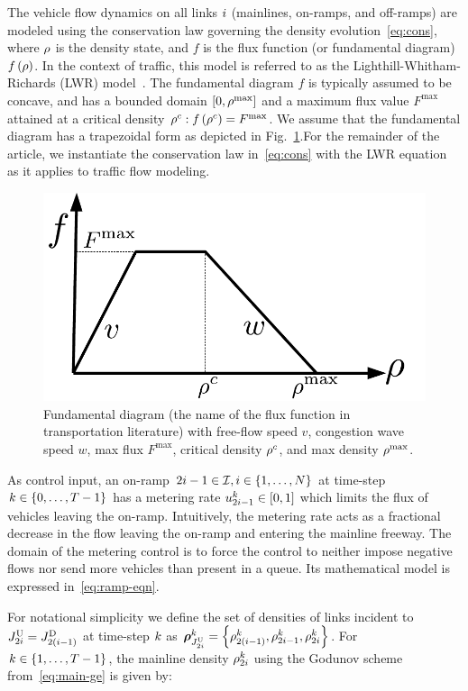 The vehicle flow dynamics on all links $i$ (mainlines, on-ramps,
and off-ramps) are modeled using the conservation law governing the
density evolution~\eqref{eq:cons}, where $\rho$ is the
density state, and $f$ is the flux function (or fundamental diagram)
$f\left(\rho\right)$. In the context of traffic, this model is
referred to as the Lighthill-Whitham-Richards (LWR) model~\cite{lighthill1955kinematic,richards1956shock}.
The fundamental diagram $f$ is typically assumed to be concave, and
has a bounded domain $\left[0,\rho^{\max}\right]$ and a maximum
flux value $F^{\max}$ attained at a critical density $\rho^{c}:f\left(\rho^{c}\right)=F^{\max}$.
We assume that the fundamental diagram has a trapezoidal form as depicted
in Fig.~\ref{fig:Fundamental-diagram-with}.For the remainder of the article, we instantiate the conservation law in~\eqref{eq:cons}
with the LWR equation as it applies to traffic flow modeling.\begin{figure}%
\begin{centering}
\includegraphics[width=0.4\columnwidth]{figs-gen/fd}
\par\end{centering}

\caption{Fundamental diagram (the name of the flux function in transportation
literature) with free-flow speed $v$, congestion wave speed $w$,
max flux $F^{\max}$, critical density $\rho^{c}$, and max density
$\rho^{\max}$.\label{fig:Fundamental-diagram-with}}
\end{figure}%


As control input, an on-ramp $2i-1\in\mathcal{I},i\in\left\{ 1,\ldots,N\right\}$
at time-step $k\in\left\{ 0,\ldots,T-1\right\}$ has a metering rate $u_{2i-1}^{k}\in\left[0,1\right]$
which limits the flux of vehicles leaving the on-ramp. Intuitively,
the metering rate acts as a fractional decrease in the flow leaving
the on-ramp and entering the mainline freeway. The domain of the metering
control is to force the control to neither impose negative flows nor
send more vehicles than present in a queue. Its mathematical model
is expressed in~\eqref{eq:ramp-eqn}.

For notational simplicity we define the set of densities of links
incident to $J_{2i}^{\text{U}}=J_{2\left(i-1\right)}^{\text{D}}$ at time-step
$k$ as $\juncstate{\jup{2\link}}{\tind}=\left\{ \discrete{2\left(\link-1\right)}{\tind},\discrete{2i-1}{\tind},\discrete{2\link}{\tind}\right\} $. For $k\in\left\{ 1,\ldots,T-1\right\}$,
the mainline density $\rho_{2i}^{k}$ using the Godunov
scheme from~\eqref{eq:main-ge} is given by:

